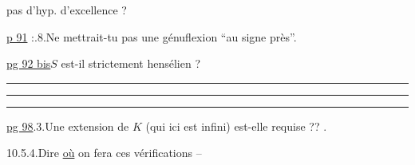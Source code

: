 pas d'hyp. d'excellence ?

\uline{p 91} :.8.\qquad Ne mettrait-tu pas une génuflexion ``au signe près''.

\uline{pg 92 bis}\qquad $S$ est-il strictement hensélien ?

\hrule\smallskip\hrule\smallskip\hrule

\quad \uline{pg 98}.3.\quad Une extension de $K$ (qui ici est infini) est-elle requise ?? .

10.5.4.\qquad Dire \uline{où} on fera ces vérifications --
